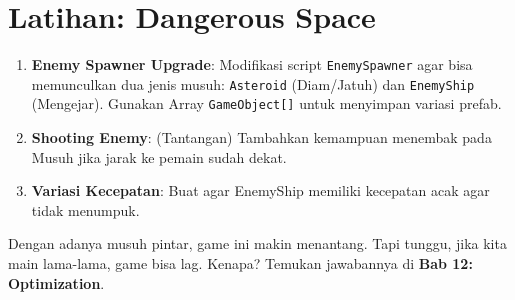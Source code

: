 
\section{Latihan: Dangerous Space}

\begin{enumerate}
    \item \textbf{Enemy Spawner Upgrade}: Modifikasi script \texttt{EnemySpawner} agar bisa memunculkan dua jenis musuh: \texttt{Asteroid} (Diam/Jatuh) dan \texttt{EnemyShip} (Mengejar). Gunakan Array \texttt{GameObject[]} untuk menyimpan variasi prefab.
    \item \textbf{Shooting Enemy}: (Tantangan) Tambahkan kemampuan menembak pada Musuh jika jarak ke pemain sudah dekat.
    \item \textbf{Variasi Kecepatan}: Buat agar EnemyShip memiliki kecepatan acak agar tidak menumpuk.
\end{enumerate}

Dengan adanya musuh pintar, game ini makin menantang. Tapi tunggu, jika kita main lama-lama, game bisa lag. Kenapa? Temukan jawabannya di \textbf{Bab 12: Optimization}.
